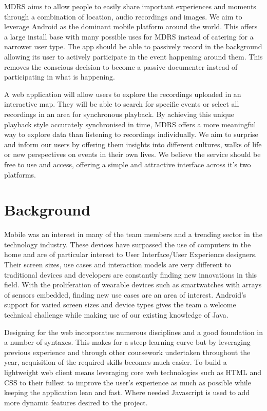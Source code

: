\documentclass{l3proj}
\begin{document}
MDRS aims to allow people to easily share important experiences and moments through a combination of location, audio recordings and images. We aim to leverage Android as the dominant mobile platform around the world. This offers a large install base with many possible uses for MDRS instead of catering for a narrower user type. The app should be able to passively record in the background allowing its user to actively participate in the event happening around them. This removes the conscious decision to become a passive documenter instead of participating in what is happening.

A web application will allow users to explore the recordings uploaded in an interactive map. They will be able to search for specific events or select all recordings in an area for synchronous playback. By achieving this unique playback style accurately synchronised in time, MDRS offers a more meaningful way to explore data than listening to recordings individually. We aim to surprise and inform our users by offering them insights into different cultures, walks of life or new perspectives on events in their own lives. We believe the service should be free to use and access, offering a simple and attractive interface across it's two platforms.

\section{Background}
Mobile was an interest in many of the team members and a trending sector in the technology industry. These devices have surpassed the use of computers in the home and are of particular interest to User Interface/User Experience designers. Their screen sizes, use cases and interaction models are very different to traditional devices and developers are constantly finding new innovations in this field. With the proliferation of wearable devices such as smartwatches with arrays of sensors embedded, finding new use cases are an area of interest.  Android’s support for varied screen sizes and device types gives the team a welcome technical challenge while making use of our existing knowledge of Java.

Designing for the web incorporates numerous disciplines and a good foundation in a number of syntaxes. This makes for a steep learning curve but by leveraging previous experience and through other coursework undertaken throughout the year, acquisition of the required skills becomes much easier. To build a lightweight web client means leveraging core web technologies such as \gls{HTML} and \gls{CSS} to their fullest to improve the user’s experience as much as possible while keeping the application lean and fast. Where needed \gls{Javascript} is used to add more dynamic features desired to the project.
\end{document}
